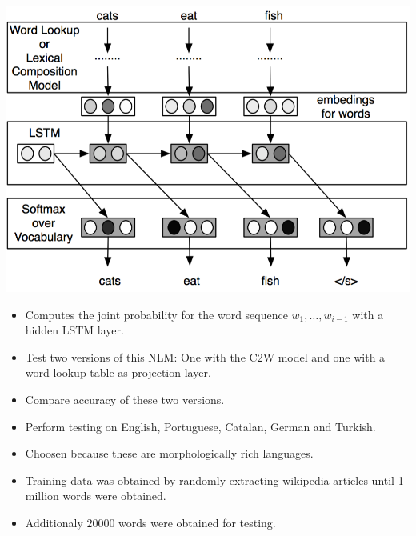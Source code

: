 \documentclass[11pt, a4paper, landscape]{article}
\begin{document}
\begin{center}
    \includegraphics[width=.5\linewidth]{../article/img/c2w-language-model}
\end{center}
\vfill
\begin{itemize}
\item Computes the joint probability for the word sequence $w_1,\dots,w_{i-1}$ with a hidden LSTM layer.
\item Test two versions of this NLM: One with the C2W model and one with a word lookup table as projection layer. 
\item Compare accuracy of these two versions.
\end{itemize}
\vfill


\NewPage{}

\vfill
\begin{itemize}
\item Perform testing on English, Portuguese, Catalan, German and Turkish.
\item Choosen because these are morphologically rich languages.
\item Training data was obtained by randomly extracting wikipedia articles until 1 million words were obtained.
\item Additionaly $20000$ words were obtained for testing.
\end{itemize}
\vfill


\NewPage{}
\end{document}
